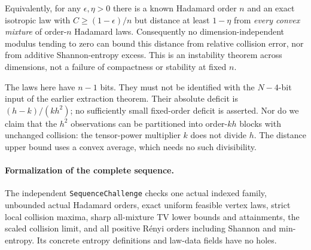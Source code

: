 Equivalently, for any $\epsilon,\eta>0$ there is a known Hadamard
order $n$ and an exact isotropic law with
$C\ge(1-\epsilon)/n$ but distance at least $1-\eta$ from
\emph{every convex mixture} of order-$n$ Hadamard laws.
Consequently no dimension-independent modulus tending to zero can
bound this distance from relative collision error, nor from additive
Shannon-entropy excess. This is an instability theorem across
dimensions, not a failure of compactness or stability at fixed $n$.

The laws here have $n-1$ bits. They must not be identified with the
$N-4$-bit input of the earlier extraction theorem. Their absolute
deficit is $(h-k)/(kh^2)$; no sufficiently small fixed-order deficit
is asserted. Nor do we claim that the $h^2$ observations can be
partitioned into order-$kh$ blocks with unchanged collision:
the tensor-power multiplier $k$ does not divide $h$. The distance
upper bound uses a convex average, which needs no such divisibility.



\paragraph{Formalization of the complete sequence.}
The independent \texttt{SequenceChallenge} checks one actual indexed
family, unbounded actual Hadamard orders, exact uniform feasible
vertex laws, strict local collision maxima, sharp all-mixture
TV lower bounds and attainments, the scaled collision limit, and
all positive R\'enyi orders including Shannon and min-entropy.
Its concrete entropy definitions and law-data fields have no holes.

